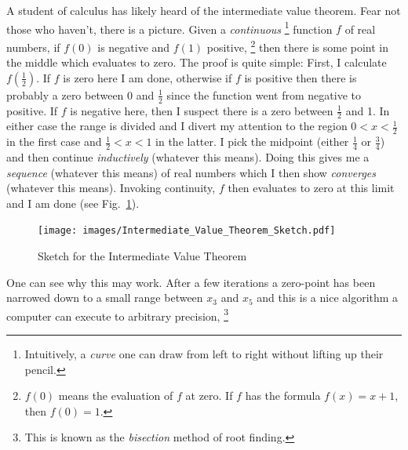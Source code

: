     \begin{example}
        \label{ex:logic_intermediate_value_therem}%
        A student of calculus has likely heard of the intermediate value
        theorem. Fear not those who haven't,
        there is a picture. Given a \textit{continuous}%
        \footnote{%
            Intuitively, a \textit{curve} one can draw from left to right
            without lifting up their pencil.%
        }
        function $f$ of real numbers, if $f(0)$ is negative and $f(1)$
        positive,%
        \footnote{%
            $f(0)$ means the evaluation of $f$ at zero. If $f$ has the formula
            $f(x)=x+1$, then $f(0)=1$.
        }
        then there is some point in the middle which evaluates to zero. The
        proof is quite simple: First, I calculate $f(\frac{1}{2})$. If $f$ is
        zero here I am done, otherwise if $f$ is positive then there is
        probably a zero between 0 and $\frac{1}{2}$ since the function went
        from negative to positive. If $f$ is negative here, then I suspect
        there is a zero between $\frac{1}{2}$ and 1. In either case the range
        is divided and I divert my attention to the region $0<x<\frac{1}{2}$
        in the first case and $\frac{1}{2}<x<1$ in the latter. I pick the
        midpoint (either $\frac{1}{4}$ or $\frac{3}{4}$) and then continue
        \textit{inductively} (whatever this means). Doing this gives me a
        \textit{sequence} (whatever this means) of real numbers which I then
        show \textit{converges} (whatever this means). Invoking continuity, $f$
        then evaluates to zero at this limit and I am done
        (see Fig.~\ref{fig:sketch_of_intermediate_value_theorem}).
    \end{example}
    \begin{figure}[H]
        \centering
        \captionsetup{type=figure}
        \texttt{[image: images/Intermediate\_Value\_Theorem\_Sketch.pdf]}
        \caption{Sketch for the Intermediate Value Theorem}
        \label{fig:sketch_of_intermediate_value_theorem}
    \end{figure}
    One can see why this may work. After a few iterations a zero-point has been
    narrowed down to a small range between $x_{3}$ and $x_{5}$ and this is a
    nice algorithm a computer can execute to arbitrary precision,%
    \footnote{%
        This is known as the \textit{bisection} method%
         of root finding.%
    }
